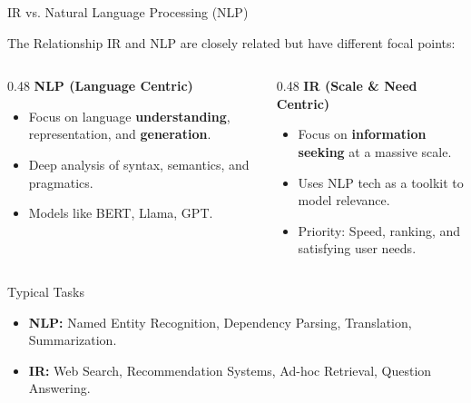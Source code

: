 \documentclass[aspectratio=169]{beamer}
\begin{document}
\begin{frame}[shrink]{IR vs. Natural Language Processing (NLP)}
\begin{block}{The Relationship}
IR and NLP are closely related but have different focal points:
\end{block}

\begin{columns}
\begin{column}{0.48\textwidth}
\textbf{NLP (Language Centric)}
\begin{itemize}
    \item Focus on language \textbf{understanding}, representation, and \textbf{generation}.
    \item Deep analysis of syntax, semantics, and pragmatics.
    \item Models like BERT, Llama, GPT.
\end{itemize}
\end{column}

\begin{column}{0.48\textwidth}
\textbf{IR (Scale \& Need Centric)}
\begin{itemize}
    \item Focus on \textbf{information seeking} at a massive scale.
    \item Uses NLP tech as a toolkit to model relevance.
    \item Priority: Speed, ranking, and satisfying user needs.
\end{itemize}
\end{column}
\end{columns}

\vspace{0.5em}

\begin{exampleblock}{Typical Tasks}
\begin{itemize}
    \item \textbf{NLP:} Named Entity Recognition, Dependency Parsing, Translation, Summarization.
    \item \textbf{IR:} Web Search, Recommendation Systems, Ad-hoc Retrieval, Question Answering.
\end{itemize}
\end{exampleblock}
\end{frame}
\end{document}
